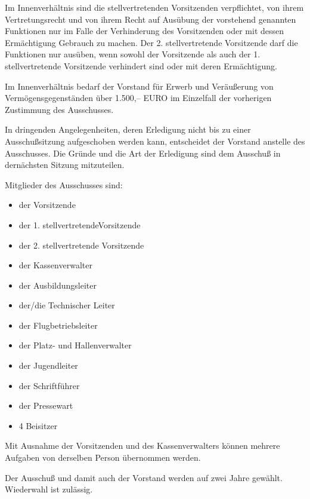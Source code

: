 \documentclass[11pt,a4paper,parskip=half]{scrartcl}
\begin{document}
\begin{contract}
\begin{multicols}{2}
		Im Innenverhältnis sind die stellvertretenden Vorsitzenden verpflichtet,
    von ihrem Vertretungsrecht und von ihrem Recht auf Ausübung der vorstehend genannten Funktionen nur im Falle der Verhinderung des Vorsitzenden oder mit dessen Ermächtigung Gebrauch zu machen.
    Der 2. stellvertretende Vorsitzende darf die Funktionen nur ausüben,
    wenn sowohl der
		Vorsitzende als auch der 1. stellvertretende Vorsitzende verhindert sind oder mit deren  Ermächtigung.

		Im Innenverhältnis bedarf der Vorstand für Erwerb und Veräußerung von  Vermögensgegenständen über 1.500,-- EURO im Einzelfall der vorherigen Zustimmung des Ausschusses.

		In dringenden Angelegenheiten,
    deren Erledigung nicht bis zu einer Ausschußsitzung aufgeschoben werden kann,
    entscheidet der Vorstand anstelle des Ausschusses.
    Die Gründe und die Art der Erledigung sind dem Ausschuß in dernächsten Sitzung mitzuteilen.

		Mitglieder des Ausschusses sind:
    \begin{itemize}
      \item der Vorsitzende
      \item der 1. stellvertretendeVorsitzende
      \item der 2. stellvertretende Vorsitzende
      \item der Kassenverwalter
      \item der Ausbildungsleiter
      \item der/die Technischer Leiter
      \item der Flugbetriebsleiter
      \item der Platz- und Hallenverwalter
      \item der Jugendleiter
      \item der Schriftführer
      \item der Pressewart
      \item 4 Beisitzer
  \end{itemize}
    Mit Ausnahme der Vorsitzenden und des Kassenverwalters können mehrere Aufgaben von derselben Person übernommen werden.

		Der Ausschuß und damit auch der Vorstand werden auf zwei Jahre gewählt.
    Wiederwahl ist zulässig.


\end{multicols}
\end{contract}
\end{document}
